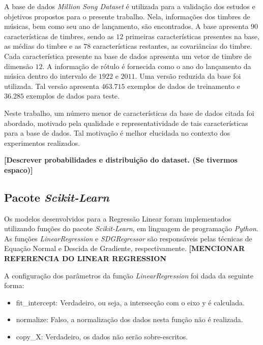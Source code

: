 \documentclass[conference]{IEEEtran}
\begin{document}
A base de dados \emph{Million Song Dataset} é utilizada para a validação dos estudos e objetivos propostos para o presente trabalho. Nela, informações dos timbres de músicas, bem como seu ano de lançamento, são encontrados.  A base apresenta $90$ características de timbres, sendo as $12$ primeiras características presentes na base, as médias do timbre e as $78$ características restantes, as covariâncias do timbre. Cada característica presente na base de dados apresenta um vetor de timbre de dimensão $12$. A informação de rótulo é fornecida como o ano do lançamento da música dentro do intervalo de $1922$ e $2011$. Uma versão reduzida da base foi utilizada. Tal versão apresenta $463.715$ exemplos de dados de treinamento e $36.285$ exemplos de dados para teste.

Neste trabalho, um número menor de características da base de dados citada foi abordado, motivado pela qualidade e representatividade de tais características para a base de dados. Tal motivação é melhor elucidada no contexto dos experimentos realizados. 

\textbf{[Descrever probabilidades e distribuição do dataset. (Se tivermos espaco)]}

\subsection{Pacote \textit{Scikit-Learn}} \label{sec:base}

Os modelos desenvolvidos para a Regressão Linear foram implementados utilizando funções do pacote \emph{Scikit-Learn}, em linguagem de programação \emph{Python}. As funções \emph{LinearRegression} e \emph{SDGRegressor} são responsáveis pelas técnicas de Equação Normal e Descida de Gradiente, respectivamente. \textbf{[MENCIONAR REFERENCIA DO LINEAR REGRESSION}

A configuração dos parâmetros da função \emph{LinearRegression} foi dada da seguinte forma:
\begin{itemize}
	\item fit\_intercept: Verdadeiro, ou seja, a intersecção com o eixo y é calculada.
	\item normalize: Falso, a normalização dos dados nesta função não é realizada.
	\item copy\_X: Verdadeiro, os dados não serão sobre-escritos.
\end{itemize}
\end{document}
